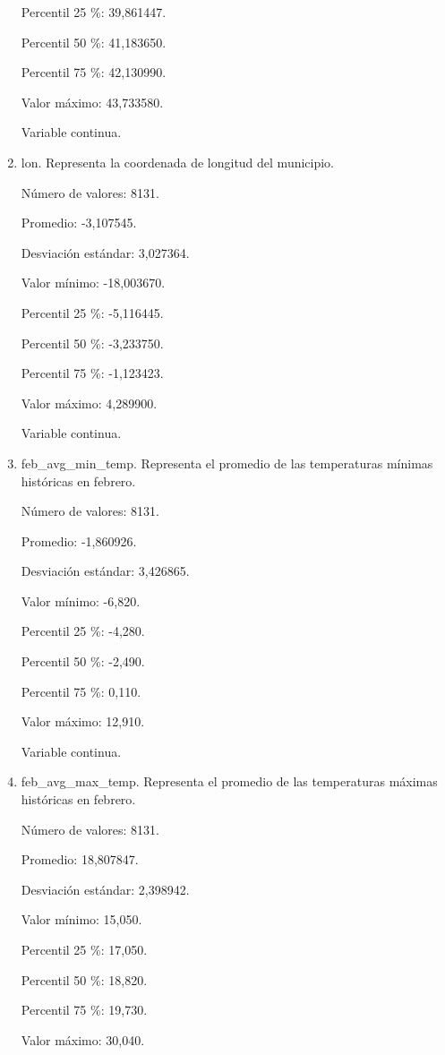\begin{enumerate}
	Percentil 25 \%: 39,861447.
	
	Percentil 50 \%: 41,183650.
	
	Percentil 75 \%: 42,130990.
	
	Valor máximo: 43,733580.
	
	Variable continua.

	\item lon. Representa la coordenada de longitud del municipio.
	
	Número de valores: 8131.
	
	Promedio: -3,107545.
	
	Desviación estándar: 3,027364.
	
	Valor mínimo: -18,003670.
	
	Percentil 25 \%: -5,116445.
	
	Percentil 50 \%: -3,233750.
	
	Percentil 75 \%: -1,123423.
	
	Valor máximo: 4,289900.
	
	Variable continua.

	\item feb\_avg\_min\_temp. Representa el promedio de las temperaturas mínimas históricas en febrero.
	
	Número de valores: 8131.
	
	Promedio: -1,860926.
	
	Desviación estándar: 3,426865.
	
	Valor mínimo: -6,820.
	
	Percentil 25 \%: -4,280.
	
	Percentil 50 \%: -2,490.
	
	Percentil 75 \%: 0,110.
	
	Valor máximo: 12,910.
	
	Variable continua.

	\item feb\_avg\_max\_temp. Representa el promedio de las temperaturas máximas históricas en febrero.
	
	Número de valores: 8131.
	
	Promedio: 18,807847.
	
	Desviación estándar: 2,398942.
	
	Valor mínimo: 15,050.
	
	Percentil 25 \%: 17,050.
	
	Percentil 50 \%: 18,820.
	
	Percentil 75 \%: 19,730.
	
	Valor máximo: 30,040.
	

\end{enumerate}
